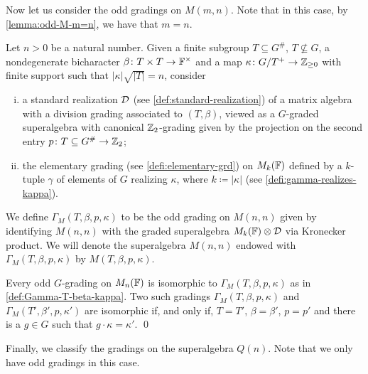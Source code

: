 
Now let us consider the odd gradings on $M(m,n)$. 
Note that in this case, by \cref{lemma:odd-M-m=n}, we have that $m = n$. 


\begin{defi}\label{def:Gamma-T-beta-kappa-odd}
    Let $n > 0$ be a natural number. 
    Given a finite subgroup $T \subseteq G^\#$, $T\not\subseteq G$, a nondegenerate bicharacter $\beta\colon T\times T \to \mathbb{F}^\times$ and a map $\kappa\colon G/T^+ \to \mathbb{Z}_{\geq 0}$ with finite support such that $|\kappa| \sqrt{|T|} = n$, consider 
    \begin{enumerate}[(i)]
        \item a standard realization $\mathcal{D}$ (see \cref{def:standard-realization}) of a matrix algebra with a division grading associated to $(T,\beta)$, viewed as a $G$-graded superalgebra with canonical $\mathbb{Z}_2$-grading given by the projection on the second entry $p\colon T \subseteq G^\# \to \mathbb{Z}_2$;
        \item the elementary grading (see \cref{defi:elementary-grd}) on $M_{k}(\mathbb{F})$ defined by a $k$-tuple $\gamma$ of elements of $G$ realizing $\kappa$, where $k \coloneqq |\kappa|$ (see \cref{defi:gamma-realizes-kappa}). 
    \end{enumerate}
    We define $\Gamma_M (T, \beta, p, \kappa)$ to be the odd grading on $M(n,n)$ given by identifying $M(n,n)$ with the graded superalgebra $M_k(\mathbb{F}) \otimes \mathcal{D}$ via Kronecker product.  
    We will denote the superalgebra $M(n,n)$ endowed with $\Gamma_M (T, \beta, p, \kappa)$ by $M (T, \beta, p, \kappa)$. 
\end{defi}

\begin{cor}\label{cor:iso-M-odd}
    Every odd $G$-grading on $M_n(\mathbb{F})$ is isomorphic to $\Gamma_M (T, \beta, p, \kappa)$ as in \cref{def:Gamma-T-beta-kappa}. 
    Two such gradings $\Gamma_M (T, \beta, p, \kappa)$ and $\Gamma_M (T', \beta', p, \kappa')$ are isomorphic if, and only if, $T = T'$, $\beta = \beta'$, $p = p'$ and there is a $g\in G$ such that $g\cdot \kappa = \kappa'$. \qed
\end{cor}


Finally, we classify the gradings on the superalgebra $Q(n)$. 
Note that we only have odd gradings in this case. 


